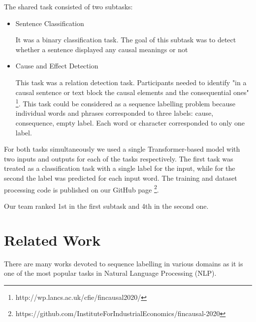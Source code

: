 \documentclass[11pt]{article}
\begin{document}
The shared task consisted of two subtasks: 
\begin{itemize}
	\item Sentence Classification
	
	It was a binary classification task. The goal of this subtask was to detect whether a sentence displayed any causal meanings or not
	
	\item Cause and Effect Detection
	
	This task was a relation detection task. Participants needed to identify "in a causal sentence or text block the causal elements and the consequential ones" \footnote{http://wp.lancs.ac.uk/cfie/fincausal2020/}. This task could be considered as a sequence labelling problem because individual words and phrases corresponded to three labels: cause, consequence, empty label. Each word or character corresponded to only one label.
\end{itemize}
For both tasks simultaneously we used a single Transformer-based model \cite{attention} with two inputs and outputs for each of the tasks respectively. The first task was treated as a classification task with a single label for the input, while for the second the label was predicted for each input word. The training and dataset processing code is published on our GitHub page \footnote{https://github.com/InstituteForIndustrialEconomics/fincausal-2020}.

Our team ranked 1st in the first subtask and 4th in the second one.
\section{Related Work}
There are many works devoted to sequence labelling in various domains as it is one of the most popular tasks in Natural Language Processing (NLP).
\end{document}
